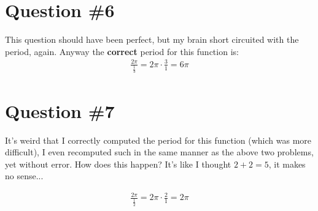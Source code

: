\section*{Question \#6}

This question should have been perfect, but my brain short circuited with the period, again. Anyway the \textbf{correct} period for this function is:
\begin{equation}
\begin{split}
\frac{2\pi}{\frac{1}{3}} = 2\pi \cdot \frac{3}{1} = 6\pi
\end{split}
\end{equation}


\section*{Question \#7}

It's weird that I correctly computed the period for this function (which was more difficult), I even recomputed such in the same manner as the above two problems, yet without error. How does this happen? It's like I thought $2+2 = 5$, it makes no sense... 


\begin{equation}
\begin{split}
\frac{2\pi}{\frac{1}{2}} = 2\pi \cdot \frac{2}{1} = 2\pi
\end{split}
\end{equation}



